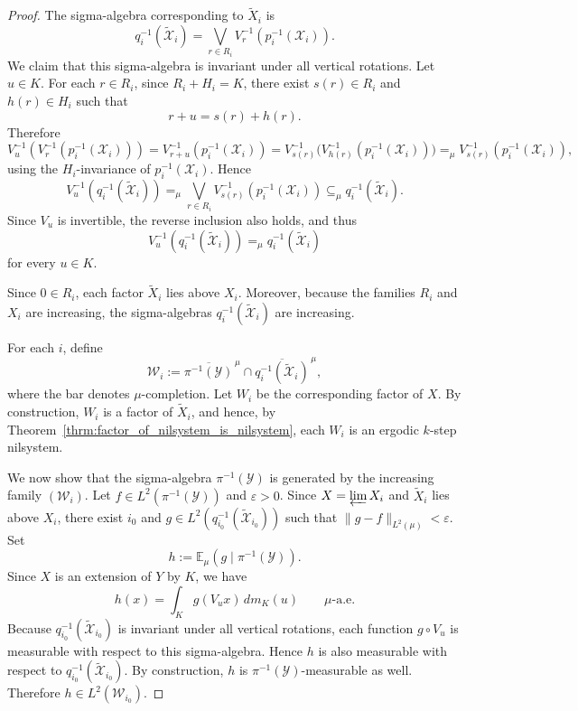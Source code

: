 \documentclass[10pt,a4paper]{amsart}
\newcommand\E{\mathbb{E}}
\newcommand\eps{\varepsilon}
\begin{document}
\begin{proof}
    The sigma-algebra corresponding to $\widetilde X_i$ is
    \[
    q_i^{-1}(\widetilde{\mathcal X}_i)
    = \bigvee_{r\in R_i} V_r^{-1}(p_i^{-1}(\mathcal X_i)).
    \]
    We claim that this sigma-algebra is invariant under all vertical rotations.
    Let $u\in K$.
    For each $r\in R_i$, since $R_i+H_i=K$, there exist $s(r)\in R_i$ and $h(r)\in H_i$ such that
    \[
    r+u=s(r)+h(r).
    \]
    Therefore
    \[
    V_u^{-1}(V_r^{-1}(p_i^{-1}(\mathcal X_i)))
    =V_{r+u}^{-1}(p_i^{-1}(\mathcal X_i))
    =V_{s(r)}^{-1}\bigl(V_{h(r)}^{-1}(p_i^{-1}(\mathcal X_i))\bigr)
    =_\mu V_{s(r)}^{-1}(p_i^{-1}(\mathcal X_i)),
    \]
    using the $H_i$-invariance of $p_i^{-1}(\mathcal X_i)$.
    Hence
    \[
    V_u^{-1}(q_i^{-1}(\widetilde{\mathcal X}_i))
    =_\mu \bigvee_{r\in R_i} V_{s(r)}^{-1}(p_i^{-1}(\mathcal X_i))
    \subseteq_\mu q_i^{-1}(\widetilde{\mathcal X}_i).
    \]
    Since $V_u$ is invertible, the reverse inclusion also holds, and thus
    \[
    V_u^{-1}(q_i^{-1}(\widetilde{\mathcal X}_i)) =_\mu q_i^{-1}(\widetilde{\mathcal X}_i)
    \]
    for every $u\in K$.

    Since $0\in R_i$, each factor $\widetilde X_i$ lies above $X_i$.
    Moreover, because the families $R_i$ and $X_i$ are increasing, the sigma-algebras $q_i^{-1}(\widetilde{\mathcal X}_i)$ are increasing.

    For each $i$, define
    \[
    \mathcal W_i
    := \overline{\pi^{-1}(\mathcal Y)}^{\,\mu}\cap
       \overline{q_i^{-1}(\widetilde{\mathcal X}_i)}^{\,\mu},
    \]
    where the bar denotes $\mu$-completion.
    Let $W_i$ be the corresponding factor of $X$.
    By construction, $W_i$ is a factor of $\widetilde X_i$, and hence, by Theorem~\ref{thrm:factor_of_nilsystem_is_nilsystem}, each $W_i$ is an ergodic $k$-step nilsystem.

    We now show that the sigma-algebra $\pi^{-1}(\mathcal Y)$ is generated by the increasing family $(\mathcal W_i)$.
    Let $f\in L^2(\pi^{-1}(\mathcal Y))$ and $\eps>0$.     Since $X=\varprojlim X_i$ and $\widetilde X_i$ lies above $X_i$, there exist $i_0$ and $ g\in L^2(q_{i_0}^{-1}(\widetilde{\mathcal X}_{i_0}))$ 
    such that $ \|g-f\|_{L^2(\mu)}<\eps$. 
    Set
    \[
    h:=\E_\mu(g\mid \pi^{-1}(\mathcal Y)).
    \]
    Since $X$ is an extension of $Y$ by $K$, we have
    \[
    h(x)=\int_K g(V_u x)\,dm_K(u)
    \qquad \mu\text{-a.e.}
    \]
    Because $q_{i_0}^{-1}(\widetilde{\mathcal X}_{i_0})$ is invariant under all vertical rotations, each function $g\circ V_u$ is measurable with respect to this sigma-algebra.
    Hence $h$ is also measurable with respect to $q_{i_0}^{-1}(\widetilde{\mathcal X}_{i_0})$.
    By construction, $h$ is $\pi^{-1}(\mathcal Y)$-measurable as well.
    Therefore $h\in L^2(\mathcal W_{i_0})$. 


\end{proof}
\end{document}
